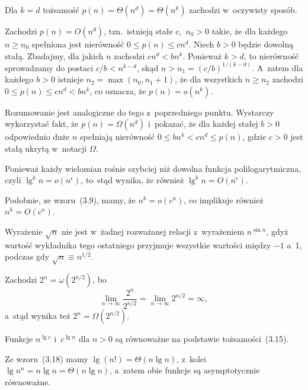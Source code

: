 \subproblem %
Dla $k=d$ tożsamość $p(n)=\Theta(n^d)=\Theta(n^k)$ zachodzi w~oczywisty sposób.

\subproblem %
Zachodzi $p(n)=O(n^d)$, tzn.\ istnieją stałe $c$,~$n_0>0$ takie, że dla każdego $n\ge n_0$ spełniona jest nierówność $0\le p(n)\le cn^d$. Niech $b>0$ będzie dowolną stałą. Zbadajmy, dla jakich $n$ zachodzi $cn^d<bn^k$. Ponieważ $k>d$, to nierówność sprowadzamy do postaci $c/b<n^{k-d}$, skąd $n>n_1=(c/b)^{1/(k-d)}$. A~zatem dla każdego $b>0$ istnieje $n_2=\max(n_0,n_1+1)$, że dla wszystkich $n\ge n_2$ zachodzi $0\le p(n)\le cn^d<bn^k$, co oznacza, że $p(n)=o(n^k)$.

\subproblem %
Rozumowanie jest analogiczne do tego z~poprzedniego punktu. Wystarczy wykorzystać fakt, że $p(n)=\Omega(n^d)$ i~pokazać, że dla każdej stałej $b>0$ odpowiednio duże $n$ spełniają nierówność $0\le bn^k<cn^d\le p(n)$, gdzie $c>0$ jest stałą ukrytą w~notacji $\Omega$.


\subproblem %
Ponieważ każdy wielomian rośnie szybciej niż dowolna funkcja polilogarytmiczna, czyli $\lg^kn=o(n^\epsilon)$, to~stąd wynika, że również $\lg^kn=O(n^\epsilon)$.

\subproblem %
Podobnie, ze wzoru~(3.9), mamy, że $n^k=o(c^n)$, co implikuje również $n^k=O(c^n)$.

\subproblem %
Wyrażenie $\sqrt{n}$ nie jest w~żadnej rozważanej relacji z~wyrażeniem $n^{\sin n}$, gdyż wartość wykładnika tego ostatniego przyjmuje wszystkie wartości między $-1$ a~1, podczas gdy $\sqrt{n}\equiv n^{1/2}$.

\subproblem %
Zachodzi $2^n=\omega(2^{n/2})$, bo
\[
	\lim_{n\to\infty}\frac{2^n}{2^{n/2}} = \lim_{n\to\infty}2^{n/2} = \infty,
\]
a~stąd wynika też $2^n=\Omega(2^{n/2})$.

\subproblem %
Funkcje $n^{\lg c}$ i~$c^{\lg n}$ dla $n>0$ są równoważne na podstawie tożsamości~(3.15).

\subproblem %
Ze wzoru~(3.18) mamy $\lg(n!)=\Theta(n\lg n)$, z~kolei $\lg n^n=n\lg n=\Theta(n\lg n)$, a~zatem obie funkcje są asymptotycznie równoważne.


